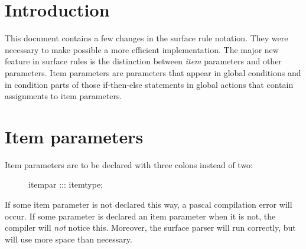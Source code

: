    
      \RosSupersedes{-}
      \MakeRosTitle
\section{Introduction}
This document contains a few changes in the surface rule notation.
They were necessary to make possible a more efficient implementation.
The major new feature in surface rules is the distinction between
{\em item} parameters and other parameters. Item parameters are parameters
that appear in global conditions and in condition parts of those if-then-else
statements in global actions that contain assignments to item parameters.
\section{Item parameters}
Item parameters are to be declared with three colons instead of two:
\begin{description}
\item[] itempar ::: itemtype;
\end{description}
If some item parameter is not declared this way, a pascal compilation error will
occur. If some parameter is declared an item parameter when it is not,
the compiler will {\em not} notice this. Moreover, the surface parser will run
correctly, but will use more space than necessary.
